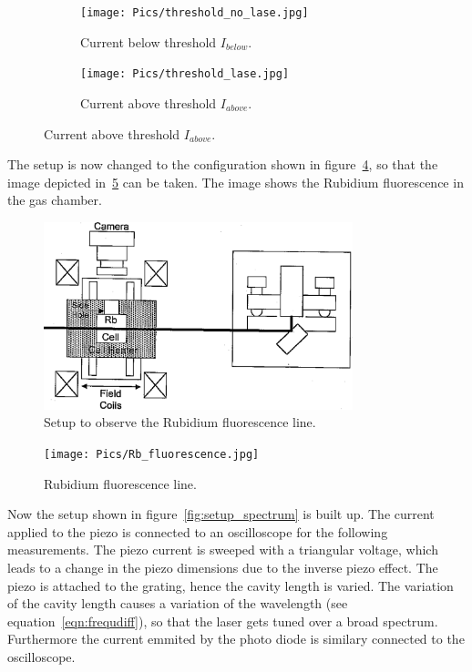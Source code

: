 \begin{figure}[h!]
  \centering
  \begin{subfigure}{0.48\textwidth}
    \centering
    \texttt{[image: Pics/threshold\_no\_lase.jpg]}
    \caption{Current below threshold $I_{below}$.}
    \label{fig:no_lase}
  \end{subfigure}
  \begin{subfigure}{0.48\textwidth}
    \centering
    \texttt{[image: Pics/threshold\_lase.jpg]}
    \caption{Current above threshold $I_{above}$.}
    \label{fig:lase}
  \end{subfigure}
\end{figure}
\FloatBarrier

The setup is now changed to the configuration shown in figure~\ref{fig:setup_fluorescence},
so that the image depicted in~\ref{fig:fluorescence} can be taken. The image
shows the Rubidium fluorescence in the gas chamber.

\begin{figure}
  \centering
  \includegraphics[width=0.8\textwidth]{Pics/setup_fluorescence.png}
  \caption{Setup to observe the Rubidium fluorescence line.\cite{anleitung}}
  \label{fig:setup_fluorescence}
\end{figure}

\begin{figure}
  \centering
  \texttt{[image: Pics/Rb\_fluorescence.jpg]}
  \caption{Rubidium fluorescence line.}
  \label{fig:fluorescence}
\end{figure}

\FloatBarrier
Now the setup shown in figure~\ref{fig:setup_spectrum} is built up.
The current applied to the piezo is connected to an oscilloscope
for the following measurements. The piezo current is sweeped with a triangular
voltage, which leads to a change in the piezo dimensions due to the inverse piezo
effect. The piezo is attached to the grating, hence the cavity length
is varied. The variation of the cavity length causes a variation of
the wavelength (see equation~\eqref{eqn:frequdiff}),
so that the laser gets tuned over a broad spectrum.
Furthermore the current emmited by the photo diode is similary connected to the oscilloscope.

